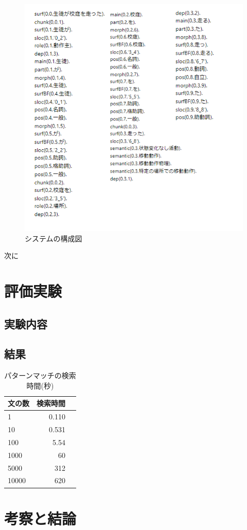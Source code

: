 \documentclass{FITpaper}
\begin{document}
\begin{figure}[htbp]
  \centering
  \includegraphics[scale=0.5]{fig/prolog_data.png}
  \caption{システムの構成図}
  \label{fig:prolog}
\end{figure}

次に
\section{評価実験}

\subsection{実験内容}
\subsection{結果}
\begin{table}[htbp]
  \centering
    \caption{パターンマッチの検索時間(秒)}
    \label{pattern_result}
    \begin{tabular}{|l||r|r|}  
      \hline
      文の数 & 検索時間\\ \hline \hline
      1 & 0.110\\\hline
      10 &  0.531\\\hline
      100 & 5.54\\ \hline
      1000 &  60 \\\hline
      5000 &  312\\\hline
      10000 &  620\\ \hline
    \end{tabular}
  \end{table}
\section{考察と結論}


%

%
\end{document}
